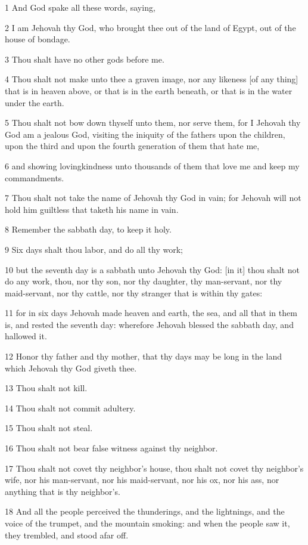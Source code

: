 \par 1 And God spake all these words, saying,
\par 2 I am Jehovah thy God, who brought thee out of the land of Egypt, out of the house of bondage.
\par 3 Thou shalt have no other gods before me.
\par 4 Thou shalt not make unto thee a graven image, nor any likeness [of any thing] that is in heaven above, or that is in the earth beneath, or that is in the water under the earth.
\par 5 Thou shalt not bow down thyself unto them, nor serve them, for I Jehovah thy God am a jealous God, visiting the iniquity of the fathers upon the children, upon the third and upon the fourth generation of them that hate me,
\par 6 and showing lovingkindness unto thousands of them that love me and keep my commandments.
\par 7 Thou shalt not take the name of Jehovah thy God in vain; for Jehovah will not hold him guiltless that taketh his name in vain.
\par 8 Remember the sabbath day, to keep it holy.
\par 9 Six days shalt thou labor, and do all thy work;
\par 10 but the seventh day is a sabbath unto Jehovah thy God: [in it] thou shalt not do any work, thou, nor thy son, nor thy daughter, thy man-servant, nor thy maid-servant, nor thy cattle, nor thy stranger that is within thy gates:
\par 11 for in six days Jehovah made heaven and earth, the sea, and all that in them is, and rested the seventh day: wherefore Jehovah blessed the sabbath day, and hallowed it.
\par 12 Honor thy father and thy mother, that thy days may be long in the land which Jehovah thy God giveth thee.
\par 13 Thou shalt not kill.
\par 14 Thou shalt not commit adultery.
\par 15 Thou shalt not steal.
\par 16 Thou shalt not bear false witness against thy neighbor.
\par 17 Thou shalt not covet thy neighbor's house, thou shalt not covet thy neighbor's wife, nor his man-servant, nor his maid-servant, nor his ox, nor his ass, nor anything that is thy neighbor's.
\par 18 And all the people perceived the thunderings, and the lightnings, and the voice of the trumpet, and the mountain smoking: and when the people saw it, they trembled, and stood afar off.
